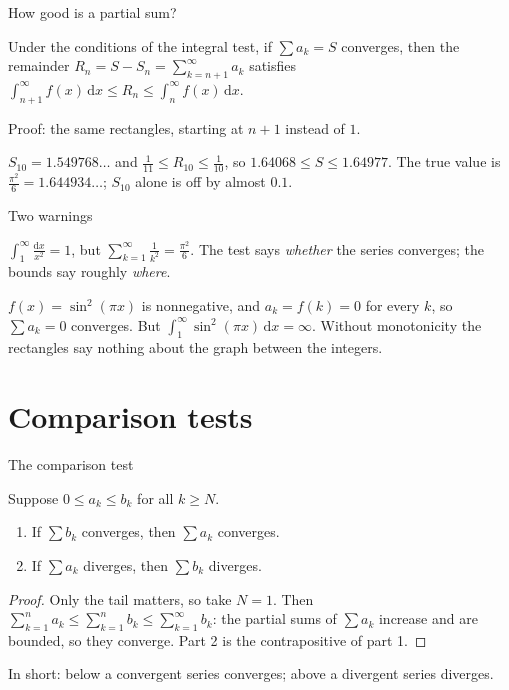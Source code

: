 \documentclass{wosm-slides}
\newcommand{\dx}{\,\mathrm{d}x}
\begin{document}
\begin{frame}{How good is a partial sum?}
  \begin{theorem}
    Under the conditions of the integral test, if $\sum a_k = S$ converges, then the
    remainder $R_n = S - S_n = \sum_{k=n+1}^\infty a_k$ satisfies
    $\int_{n+1}^{\infty} f(x)\dx \le R_n \le \int_n^\infty f(x)\dx$.
  \end{theorem}
  {\small Proof: the same rectangles, starting at $n + 1$ instead of $1$.\par}
  \pause
  \begin{example}[$\sum \frac{1}{k^2}$ with $n = 10$]
    $S_{10} = 1.549768\ldots$ and $\frac{1}{11} \le R_{10} \le \frac{1}{10}$, so
    $1.64068 \le S \le 1.64977$. The true value is $\frac{\pi^2}{6} = 1.644934\ldots$;
    $S_{10}$ alone is off by almost $0.1$.
  \end{example}
\end{frame}

\begin{frame}{Two warnings}
  \begin{warning}
    $\int_1^\infty \frac{\mathrm{d}x}{x^2} = 1$, but $\sum_{k=1}^\infty \frac{1}{k^2} = \frac{\pi^2}{6}$.
    The test says \emph{whether} the series converges; the bounds say roughly \emph{where}.
  \end{warning}
  \pause
  \begin{warning}
    $f(x) = \sin^2(\pi x)$ is nonnegative, and $a_k = f(k) = 0$ for every $k$,
    so $\sum a_k = 0$ converges. But $\int_1^\infty \sin^2(\pi x)\dx = \infty$.
    Without monotonicity the rectangles say nothing about the graph between the integers.
  \end{warning}
\end{frame}

\section{Comparison tests}

\begin{frame}{The comparison test}
  \begin{theorem}
    Suppose $0 \le a_k \le b_k$ for all $k \ge N$.
    \begin{enumerate}
      \item If $\sum b_k$ converges, then $\sum a_k$ converges.
      \item If $\sum a_k$ diverges, then $\sum b_k$ diverges.
    \end{enumerate}
  \end{theorem}
  \pause
  \begin{proof}
    Only the tail matters, so take $N = 1$. Then
    $\sum_{k=1}^n a_k \le \sum_{k=1}^n b_k \le \sum_{k=1}^\infty b_k$:
    the partial sums of $\sum a_k$ increase and are bounded, so they converge.
    Part 2 is the contrapositive of part 1.
  \end{proof}
  In short: below a convergent series converges; above a divergent series diverges.
\end{frame}
\end{document}
